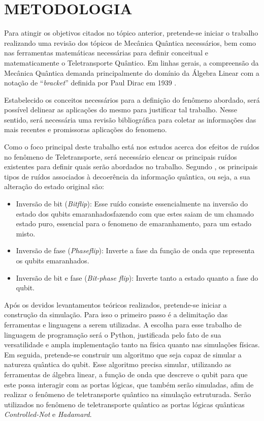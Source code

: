 \documentclass[12pt,oneside,brazil,hidelinks,article,sumario=tradicional,a4paper]{abntex2}
\begin{document}
\clearpage

\section{METODOLOGIA}

Para atingir os objetivos citados no tópico anterior, pretende-se iniciar o trabalho realizando uma revisão dos tópicos de Mecânica Quântica necessários, bem como nas ferramentas matemáticas necessárias para definir conceitual e matematicamente o Teletransporte Quântico. Em linhas gerais, a compreensão da Mecânica Quântica demanda principalmente do domínio da Álgebra Linear com a notação de ``\textit{bracket}'' definida por Paul Dirac em 1939 \cite{DIRAC}.

Estabelecido os conceitos necessários para a definição do fenômeno abordado, será possível delinear as aplicações do mesmo para justificar tal trabalho. Nesse sentido, será necessária uma revisão bibliográfica para coletar as informações das mais recentes e promissoras aplicações do fenomeno.

Como o foco principal deste trabalho está nos estudos acerca dos efeitos de ruídos no fenômeno de Teletransporte, será necessário elencar os principais ruídos existentes para definir quais serão abordados no trabalho. Segundo \cite{teseufscar}, os principais tipos de ruídos associados à decoerência da informação quântica, ou seja, a sua alteração do estado original são:

\begin{itemize}
\item Inversão de bit (\textit{Bitflip}): Esse ruído consiste essencialmente na inversão do estado dos qubits emaranhadosfazendo com que estes saiam de um chamado estado puro, essencial para o fenomeno de emaranhamento, para um estado misto.
\item Inversão de fase (\textit{Phaseflip}): Inverte a fase da função de onda que representa os qubits emaranhados.
\item  Inversão de bit e fase (\textit{Bit-phase flip}): Inverte tanto a estado quanto a fase do qubit.
\end{itemize} 

Após os devidos levantamentos teóricos realizados, pretende-se iniciar a construção da simulação. Para isso o primeiro passo é a delimitação das ferramentas e linguagens a serem utilizadas. A escolha para esse trabalho de linguagem de programação será o Python, justificada pelo fato de sua versatilidade e ampla implementação tanto na física quanto nas simulações físicas. 
Em seguida, pretende-se construir um algoritmo que seja capaz de simular a natureza quântica do qubit. Esse algoritmo precisa simular, utilizando as ferramentas de álgebra linear, a função de onda que descreve o qubit para que este possa interagir com as portas lógicas, que também serão simuladas, afim de realizar o fenômeno de teletransporte quântico na simulação estruturada.
Serão utilizados no fenômeno de teletransporte quântico as portas lógicas quânticas \textit{Controlled-Not} e \textit{Hadamard}.
\end{document}

